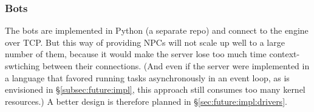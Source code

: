 \subsubsection{Bots}\label{sec:bots-current}

The bots are implemented in Python (a separate repo) and connect to the
engine over TCP\@.
But this way of providing NPCs will not scale up well to a large number
of them, because it would make the server lose too much time context-swtiching
between their connections.
(And even if the server were implemented in a language that favored running
tasks asynchronously in an event loop, as is envisioned in
\S\ref{subsec:future:impl}, this approach still consumes
too many kernel resources.)
A better design is therefore planned in \S\ref{sec:future:impl:drivers}.